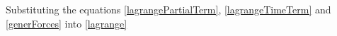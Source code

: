 \documentclass[sublist]{fei}
\begin{document}
Substituting the equations \eqref{lagrangePartialTerm}, \eqref{lagrangeTimeTerm} and \eqref{generForces} into \eqref{lagrange}
\end{document}
